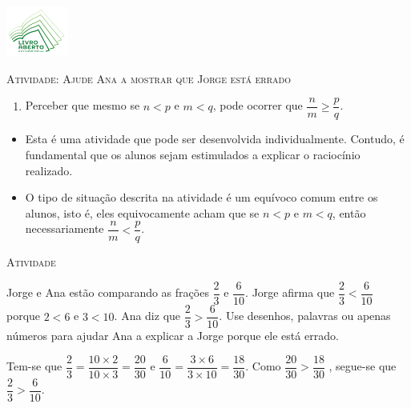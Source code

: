 \documentclass[10 pt,usenames,dvipsnames, oneside]{article}
\begin{document}
\begin{center}
  \begin{minipage}[l]{3cm}
\includegraphics[width=2cm]{../../../Figuras/logo}       
\end{minipage}\hfill
\begin{minipage}[r]{.8\textwidth}
 {\Large \scshape Atividade: Ajude Ana a mostrar que Jorge está errado}  
\end{minipage}
\end{center}
\vspace{.2cm}

\ifdefined\prof
\begin{goals}
\begin{enumerate}
\item       Perceber que mesmo se       $n < p$       e       $m < q$, pode
ocorrer que       $\dfrac{n}{m} \geq \dfrac{p}{q}$.
\end{enumerate}

\tcblower

\begin{itemize}
\item       Esta é uma atividade que pode ser desenvolvida individualmente.
Contudo, é fundamental que os alunos sejam estimulados a explicar o raciocínio
realizado.
\item       O tipo de situação descrita na atividade é um equívoco comum
entre os alunos, isto é, eles equivocamente acham que se       $n < p$       e
$m < q$, então necessariamente       $\dfrac{n}{m} < \dfrac{p}{q}$.
\end{itemize}
\end{goals}

\bigskip
\begin{center}
{\large \scshape Atividade}
\end{center}
\fi

Jorge e Ana estão comparando as frações $\dfrac{2}{3}$ e $\dfrac{6}{10}$. Jorge afirma que
$\dfrac{2}{3} < \dfrac{6}{10}$ porque $2 < 6$ e $3 < 10$. Ana diz que $\dfrac{2}{3} > \dfrac{6}{10}$. Use desenhos, palavras ou apenas números para ajudar Ana a explicar a Jorge porque ele está errado.

\ifdefined\prof
\begin{solucao}

Tem-se que   $\dfrac{2}{3} = \dfrac{10 \times 2}{10 \times 3} = \dfrac{20}{30}$
e
$\dfrac{6}{10} = \dfrac{3 \times 6}{3 \times 10} = \dfrac{18}{30}$.
Como   $\dfrac{20}{30} > \dfrac{18}{30}$  , segue-se que   $\dfrac{2}{3} >
\dfrac{6}{10}$.
\end{solucao}
\fi
\end{document}
